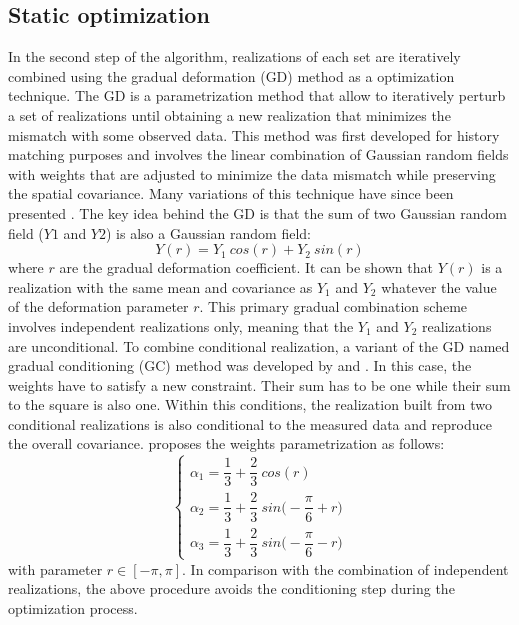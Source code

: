 \subsection{Static optimization}
In the second step of the algorithm, realizations of each set are iteratively
combined using the gradual deformation (GD) method \citep{Hu2000} as a
optimization technique. The GD is a parametrization method that allow to
iteratively perturb a set of realizations until obtaining a new realization that
minimizes the mismatch with some observed data. This method was first developed
for history matching purposes \citep{Roggero1998} and involves the linear
combination of Gaussian random fields with weights that are adjusted to minimize
the data mismatch while preserving the spatial covariance. Many variations of
this technique have since been presented
\citep{Roggero1998,Hu2000,Hu2002,Hu2001,LeRavalec2000,LeRavalec2012}. The key
idea behind the GD is that the sum of two Gaussian random field ($Y1$ and $Y2$)
is also a Gaussian random field:
\begin{equation}
Y(r) = Y_1\ cos(r) + Y_2\ sin(r)
\end{equation}
where $r$ are the gradual deformation coefficient. It can be shown that $Y(r)$
is a realization with the same mean and covariance as $Y_1$ and $Y_2$ whatever
the value of the deformation parameter $r$. This primary gradual combination
scheme involves independent realizations only, meaning that the $Y_1$ and $Y_2$
realizations are unconditional. To combine conditional realization, a variant of
the GD named gradual conditioning (GC) method was developed by \citet{Ying2000}
and \citet{Hu2002}. In this case, the  weights have to satisfy a new constraint.
Their sum has to be one while their sum to the square is also one. Within this
conditions, the realization built from two conditional realizations is also
conditional to the measured data and reproduce the overall covariance.
\citet{Hu2002} proposes the weights parametrization as follows:
\begin{equation}
\begin{cases}
    \alpha_1 = \dfrac{1}{3} + \dfrac{2}{3}\ cos(r)\\
    \alpha_2 = \dfrac{1}{3} + \dfrac{2}{3}\ sin\bigg(-\dfrac{\pi}{6}+r\bigg)\\
    \alpha_3 = \dfrac{1}{3} + \dfrac{2}{3}\ sin\bigg(-\dfrac{\pi}{6}-r\bigg)
    \end{cases}
\end{equation}
with parameter $r \in [-\pi,\pi]$. In comparison with the combination of
independent realizations, the above procedure avoids the conditioning step
during the optimization process.\\

